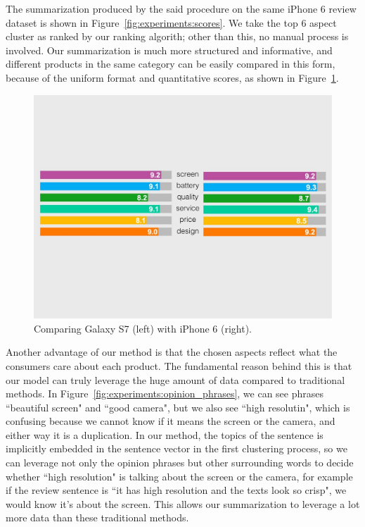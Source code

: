 The summarization produced by the said procedure on the same iPhone 6 review dataset is shown in Figure~\ref{fig:experiments:scores}. We take the top 6 aspect cluster as ranked by our ranking algorith; other than this, no manual process is involved. Our summarization is much more structured and informative, and different products in the same category can be easily compared in this form, because of the uniform format and quantitative scores, as shown in  Figure~\ref{fig:experiments:comparison}.

\begin{figure}[h!]
\centering
\includegraphics[width=1.0\columnwidth]{figures/experiments/comparison}
\caption{Comparing Galaxy S7 (left) with iPhone 6 (right).}
\label{fig:experiments:comparison}
\end{figure}

Another advantage of our method is that the chosen aspects reflect what the consumers care about each product. The fundamental reason behind this is that our model can truly leverage the huge amount of data compared to traditional methods. In Figure~\ref{fig:experiments:opinion_phrases}, we can see phrases ``beautiful screen" and ``good camera", but we also see ``high resolutin", which is confusing because we cannot know if it means the screen or the camera, and either way it is a duplication. In our method, the topics of the sentence is implicitly embedded in the sentence vector in the first clustering process, so we can leverage not only the opinion phrases but other surrounding words to decide whether ``high resolution" is talking about the screen or the camera, for example if the review sentence is ``it has high resolution and the texts look so crisp", we would know it's about the screen. This allows our summarization to leverage a lot more data than these traditional methods.
